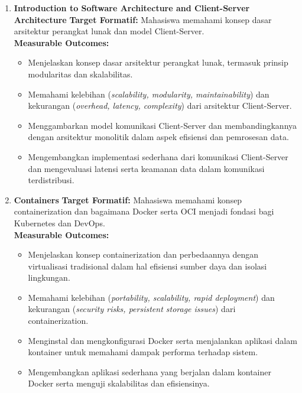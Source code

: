 \begin{enumerate}

\item \textbf{Introduction to Software Architecture and Client-Server Architecture}  
\textbf{Target Formatif:} Mahasiswa memahami konsep dasar arsitektur perangkat lunak dan model Client-Server.  \\
\textbf{Measurable Outcomes:}
\begin{itemize}
\item Menjelaskan konsep dasar arsitektur perangkat lunak, termasuk prinsip modularitas dan skalabilitas.
\item Memahami kelebihan (\textit{scalability, modularity, maintainability}) dan kekurangan (\textit{overhead, latency, complexity}) dari arsitektur Client-Server.
\item Menggambarkan model komunikasi Client-Server dan membandingkannya dengan arsitektur monolitik dalam aspek efisiensi dan pemrosesan data.
\item Mengembangkan implementasi sederhana dari komunikasi Client-Server dan mengevaluasi latensi serta keamanan data dalam komunikasi terdistribusi.
\end{itemize}

\item \textbf{Containers}  
\textbf{Target Formatif:} Mahasiswa memahami konsep containerization dan bagaimana Docker serta OCI menjadi fondasi bagi Kubernetes dan DevOps.  \\
\textbf{Measurable Outcomes:}
\begin{itemize}
\item Menjelaskan konsep containerization dan perbedaannya dengan virtualisasi tradisional dalam hal efisiensi sumber daya dan isolasi lingkungan.
\item Memahami kelebihan (\textit{portability, scalability, rapid deployment}) dan kekurangan (\textit{security risks, persistent storage issues}) dari containerization.
\item Menginstal dan mengkonfigurasi Docker serta menjalankan aplikasi dalam kontainer untuk memahami dampak performa terhadap sistem.
\item Mengembangkan aplikasi sederhana yang berjalan dalam kontainer Docker serta menguji skalabilitas dan efisiensinya.
\end{itemize}


\end{enumerate}
